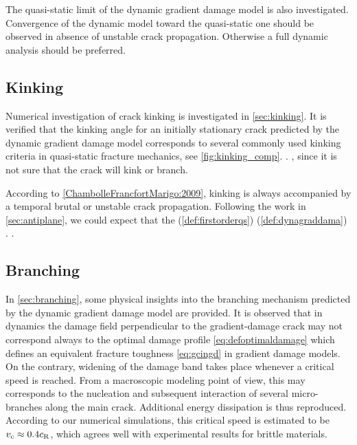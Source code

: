The quasi-static limit of the dynamic gradient damage model is also investigated. Convergence of the dynamic model toward the quasi-static one should be observed in absence of unstable crack propagation. Otherwise a full dynamic analysis should be preferred.

\subsection{Kinking}
Numerical investigation of crack kinking is investigated in \cref{sec:kinking}. It is verified that the kinking angle for an initially stationary crack predicted by the dynamic gradient damage model corresponds to several commonly used kinking criteria in quasi-static fracture mechanics, see \cref{fig:kinking_comp}. . , since it is not sure that the crack will kink or branch.

According to \cref{ChambolleFrancfortMarigo:2009}, kinking is always accompanied by a temporal brutal or unstable crack propagation. Following the work in \cref{sec:antiplane}, we could expect that the  (\cref{def:firstorderqs})  (\cref{def:dynagraddama}) . .

\subsection{Branching}
In \cref{sec:branching}, some physical insights into the branching mechanism predicted by the dynamic gradient damage model are provided. It is observed that in dynamics the damage field perpendicular to the gradient-damage crack may not correspond always to the optimal damage profile \eqref{eq:defoptimaldamage} which defines an equivalent fracture toughness \eqref{eq:gcingd} in gradient damage models. On the contrary, widening of the damage band takes place whenever a critical speed is reached. From a macroscopic modeling point of view, this may corresponds to the nucleation and subsequent interaction of several micro-branches along the main crack. Additional energy dissipation is thus reproduced. According to our numerical simulations, this critical speed is estimated to be $v_{\mathrm{c}}\approx0.4c_\mathrm{R}$, which agrees well with experimental results for brittle materials.

